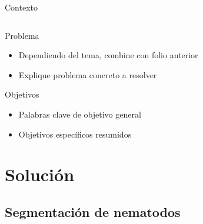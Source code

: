 \documentclass[15pt]{beamer} %
\begin{document}
\begin{frame}{Contexto}
\begin{columns}
  \end{columns}
\end{frame}

\begin{frame}{Problema}
  
  \begin{itemize}
  \item Dependiendo del tema, combine con folio anterior
  \item Explique problema concreto a resolver
  \end{itemize}
\end{frame}

\begin{frame}{Objetivos}
  
  \begin{itemize}
  \item Palabras clave de objetivo general
  \item Objetivos específicos resumidos 
  \end{itemize}
\end{frame}


\section{Solución}

\subsection{Segmentación de nematodos}
\end{document}
